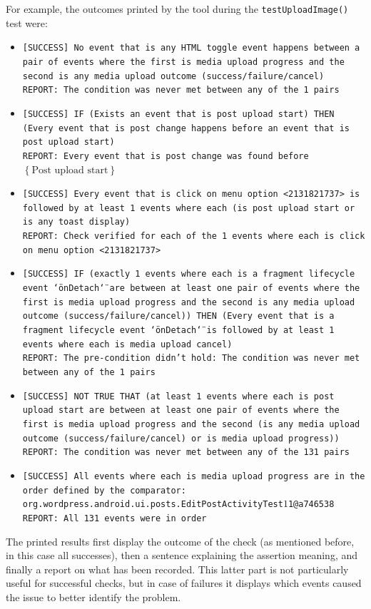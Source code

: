 \documentclass[11pt,a4paper,notitlepage]{article}
\begin{document}
For example, the outcomes printed by the tool during the \texttt{testUploadImage()} test were:
\begin{itemize}
	\item \texttt{[SUCCESS] No event that is any HTML toggle event happens between a pair of events where the first is media upload progress and the second is any media upload outcome (success/failure/cancel)\\
REPORT: The condition was never met between any of the 1 pairs}
	\item \texttt{[SUCCESS] IF (Exists an event that is post upload start) THEN (Every event that is post change happens before an event that is post upload start)\\
REPORT: Every event that is post change was found before $\left\{\text{Post upload start}\right\}$}
	\item \texttt{[SUCCESS] Every event that is click on menu option <2131821737> is followed by at least 1 events where each (is post upload start or is any toast display)\\
REPORT: Check verified for each of the 1 events where each is click on menu option <2131821737>}
	\item \texttt{[SUCCESS] IF (exactly 1 events where each is a fragment lifecycle event \char`\"onDetach\char`\"~are between at least one pair of events where the first is media upload progress and the second is any media upload outcome (success/failure/cancel)) THEN (Every event that is a fragment lifecycle event \char`\"onDetach\char`\"~is followed by at least 1 events where each is media upload cancel)\\
REPORT: The pre-condition didn't hold: The condition was never met between any of the 1 pairs}
	\item \texttt{[SUCCESS] NOT TRUE THAT (at least 1 events where each is post upload start are between at least one pair of events where the first is media upload progress and the second (is any media upload outcome (success/failure/cancel) or is media upload progress))\\
REPORT: The condition was never met between any of the 131 pairs}
	\item \texttt{[SUCCESS] All events where each is media upload progress are in the order defined by the comparator: org.wordpress.android.ui.posts.EditPostActivityTest$1$1@a746538\\
REPORT: All 131 events were in order}
\end{itemize}
The printed results first display the outcome of the check (as mentioned before, in this case all successes), then a sentence explaining the assertion meaning, and finally a report on what has been recorded. This latter part is not particularly useful for successful checks, but in case of failures it displays which events caused the issue to better identify the problem.
\end{document}
